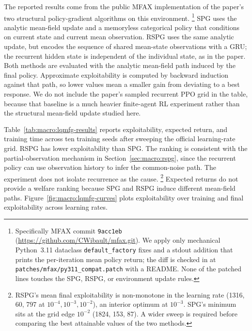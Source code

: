 The reported results come from the public MFAX implementation of the
paper's two structural policy-gradient algorithms on this environment.%
\footnote{Specifically MFAX commit \texttt{9acc1eb}
(\url{https://github.com/CWibault/mfax.git}). We apply only mechanical
Python~3.11 dataclass \texttt{default\_factory} fixes and a stdout
addition that prints the per-iteration mean policy return; the diff is
checked in at \texttt{patches/mfax/py311\_compat.patch} with a README.
None of the patched lines touches the SPG, RSPG, or environment update
rules.}
SPG uses the analytic mean-field update and a memoryless categorical
policy that conditions on current state and current mean observation.
RSPG uses the same analytic update, but encodes the sequence of shared
mean-state observations with a GRU; the recurrent hidden state is
independent of the individual state, as in the paper. Both methods are
evaluated with the analytic mean-field path induced by the final
policy. Approximate exploitability is computed by backward induction
against that path, so lower values mean a smaller gain from deviating
to a best response. We do not include the paper's sampled recurrent PPO
grid in the table, because that baseline is a much heavier finite-agent
RL experiment rather than the structural mean-field update studied here.

\begin{table}[ht]
\centering

\caption{Partially observable Linear-Quadratic mean field game. Approximate
exploitability is computed by a best-response dynamic program on the
analytic mean-field path induced by the final policy. Expected return and
training time are averaged over 10 training seeds, with standard errors
across seeds. Learning rates are selected from the official MFAX grid
$\{10^{-4},10^{-3},10^{-2}\}$ by mean final exploitability for each
method.}
\label{tab:macro:lqmfg-results}
\end{table}

Table~\ref{tab:macro:lqmfg-results} reports exploitability, expected
return, and training time across ten training seeds after sweeping the
official learning-rate grid. RSPG has lower exploitability than SPG.
The ranking is consistent with the partial-observation mechanism in
Section~\ref{sec:macro:rspg}, since the recurrent policy can use
observation history to infer the common-noise path. The experiment does
not isolate recurrence as the cause.%
\footnote{RSPG's mean final exploitability is non-monotone in the
learning rate (1316, 60, 797 at $10^{-4}, 10^{-3}, 10^{-2}$), an
interior optimum at $10^{-3}$. SPG's minimum sits at the grid edge
$10^{-2}$ (1824, 153, 87). A wider sweep is required before comparing
the best attainable values of the two methods.}
Expected returns do not provide a welfare ranking because SPG and RSPG
induce different mean-field paths.
Figure~\ref{fig:macro:lqmfg-curves} plots exploitability over training
and final exploitability across learning rates.

